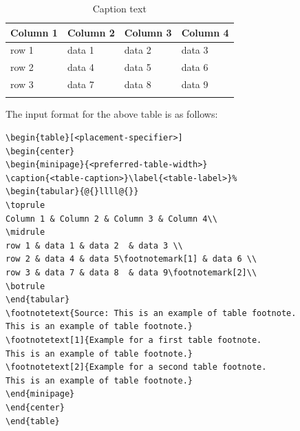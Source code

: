 \begin{table}[ht]
\begin{center}
\begin{minipage}{174pt}
\caption{Caption text}\label{tab1}%
\begin{tabular}{@{}llll@{}}
\toprule
Column 1 & Column 2  & Column 3 & Column 4\\
\midrule
row 1    & data 1   & data 2  & data 3  \\
row 2    & data 4   & data 5\footnotemark[1]  & data 6  \\
row 3    & data 7   & data 8  & data 9\footnotemark[2]  \\
\botrule
\end{tabular}
\end{minipage}
\end{center}
\end{table}

\noindent
The input format for the above table is as follows:

\bigskip
\begin{verbatim}
\begin{table}[<placement-specifier>]
\begin{center}
\begin{minipage}{<preferred-table-width>}
\caption{<table-caption>}\label{<table-label>}%
\begin{tabular}{@{}llll@{}}
\toprule
Column 1 & Column 2 & Column 3 & Column 4\\
\midrule
row 1 & data 1 & data 2	 & data 3 \\
row 2 & data 4 & data 5\footnotemark[1] & data 6 \\
row 3 & data 7 & data 8	 & data 9\footnotemark[2]\\
\botrule
\end{tabular}
\footnotetext{Source: This is an example of table footnote. 
This is an example of table footnote.}
\footnotetext[1]{Example for a first table footnote.
This is an example of table footnote.}
\footnotetext[2]{Example for a second table footnote. 
This is an example of table footnote.}
\end{minipage}
\end{center}
\end{table}
\end{verbatim}
\bigskip


